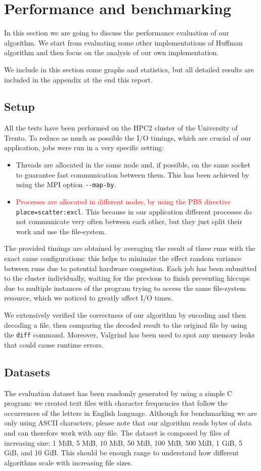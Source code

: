 \section{Performance and benchmarking}
In this section we are going to discuss the performance evaluation of our algorithm. We start from evaluating some other implementations of Huffman algorithm and then focus on the analysis of our own implementation. 

We include in this section some graphs and statistics, but all detailed results are included in the appendix at the end this report.
\subsection{Setup}
All the tests have been performed on the HPC2 cluster of the University of Trento. To reduce as much as possible the I/O timings, which are crucial of our application, jobs were run in a very specific setting:

\begin{itemize}
	\item Threads are allocated in the same node and, if possible, on the same socket to guarantee fast communication between them. This has been achieved by using the MPI option \verb|--map-by|.
	\item \textcolor{red}{Processes are allocated in different nodes, by using the PBS directive} \verb|place=scatter:excl|. This because in our application different processes do not communicate very often between each other, but they just split their work and use the file-system. 
\end{itemize}

The provided timings are obtained by averaging the result of three runs with the exact same configurations: this helps to minimize the effect random variance between runs due to potential hardware congestion.
Each job has been submitted to the cluster individually, waiting for the previous to finish preventing hiccups due to multiple instances of the program trying to access the same file-system resource, which we noticed to greatly affect I/O times.

We extensively verified the correctness of our algorithm by encoding and then decoding a file, then comparing the decoded result to the original file by using the \verb|diff| command. Moreover, Valgrind has been used to spot any memory leaks that could cause runtime errors.

\subsection{Datasets}
The evaluation dataset has been randomly generated by using a simple C program: we created text files with character frequencies that follow the occurrences of the letters in English language. Although for benchmarking we are only using ASCII characters, please note that our algorithm reads bytes of data and can therefore work with any file.
The dataset is composed by files of increasing size: 1 MiB, 5 MiB, 10 MiB, 50 MiB, 100 MiB, 500 MiB, 1 GiB, 5 GiB, and 10 GiB. This should be enough range to understand how different algorithms scale with increasing file sizes.

